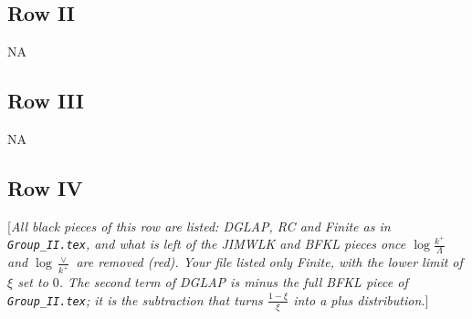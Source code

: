 \documentclass[9pt]{article}
\numberwithin{equation}{section}
\newcommand{\rnote}[1]{{\color{teal}[\textit{#1}]}}
\begin{document}
\subsection{Row II}
\textsc{NA}
\subsection{Row III}
\textsc{NA}
\subsection{Row IV}
\rnote{All black pieces of this row are listed: DGLAP, RC and Finite as in \texttt{Group\_II.tex}, and what is left of the JIMWLK and BFKL pieces once $\log\frac{k^{+}}{\Lambda}$ and $\log\frac{\vee}{k^{+}}$ are removed (red). Your file listed only Finite, with the lower limit of $\xi$ set to $0$. The second term of DGLAP is minus the full BFKL piece of \texttt{Group\_II.tex}; it is the subtraction that turns $\frac{1-\xi}{\xi}$ into a plus distribution.}
\end{document}
